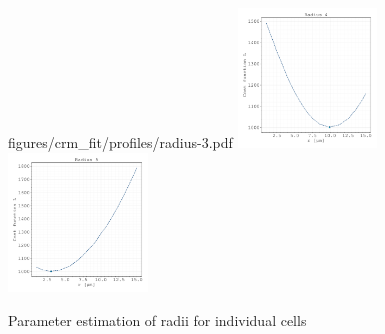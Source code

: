 \documentclass{article}
\begin{document}
\begin{figure}[H]
        {figures/crm_fit/profiles/radius-3.pdf}%
    \includegraphics[width=0.33\textwidth]
        {figures/crm_fit/profiles/radius-4.pdf}%
    \includegraphics[width=0.33\textwidth]
        {figures/crm_fit/profiles/radius-5.pdf}%
    \caption{Parameter estimation of radii for individual cells}%
    \label{fig:parameter-estimates-supplement-radii}
\end{figure}

\end{document}
